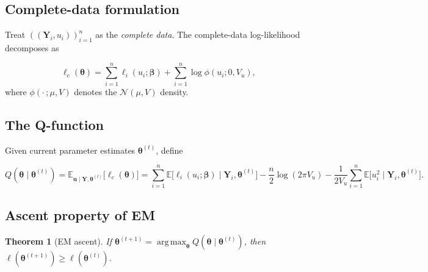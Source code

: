 \documentclass[11pt,a4paper]{article}
\newtheorem{theorem}{Theorem}[section]
\theoremstyle{definition}
\theoremstyle{remark}
\newcommand{\E}{\mathbb{E}}
\newcommand{\N}{\mathcal{N}}
\newcommand{\bY}{\mathbf{Y}}
\newcommand{\bu}{\mathbf{u}}
\newcommand{\bbeta}{\boldsymbol{\beta}}
\newcommand{\btheta}{\boldsymbol{\theta}}
\newcommand{\given}{\mid}
\DeclareMathOperator*{\argmax}{arg\,max}
\begin{document}
\subsection{Complete-data formulation}

Treat $((\bY_i, u_i))_{i=1}^n$ as the \emph{complete data}.  The
complete-data log-likelihood decomposes as

\begin{equation}
  \ell_c(\btheta) = \sum_{i=1}^n \ell_i(u_i;\bbeta)
    + \sum_{i=1}^n \log \phi(u_i; 0, V_u),
  \label{eq:complete-loglik}
\end{equation}
where $\phi(\cdot\,;\mu,V)$ denotes the $\N(\mu,V)$ density.

\subsection{The Q-function}

Given current parameter estimates $\btheta^{(t)}$, define

\begin{equation}
  Q(\btheta \given \btheta^{(t)})
    = \E_{\bu \given \bY,\btheta^{(t)}}\bigl[\ell_c(\btheta)\bigr]
    = \sum_{i=1}^n \E\bigl[\ell_i(u_i;\bbeta) \given \bY_i, \btheta^{(t)}\bigr]
    - \frac{n}{2}\log(2\pi V_u)
    - \frac{1}{2V_u}\sum_{i=1}^n \E\bigl[u_i^2 \given \bY_i, \btheta^{(t)}\bigr].
  \label{eq:Q}
\end{equation}

\subsection{Ascent property of EM}

\begin{theorem}[EM ascent]\label{thm:em-ascent}
If $\btheta^{(t+1)} = \argmax_{\btheta} Q(\btheta \given \btheta^{(t)})$,
then $\ell(\btheta^{(t+1)}) \geq \ell(\btheta^{(t)})$.
\end{theorem}
\end{document}
